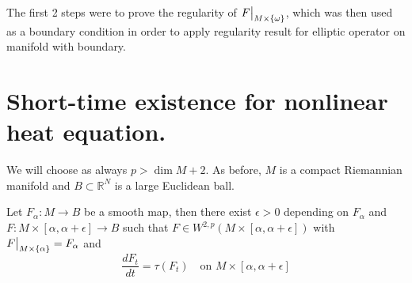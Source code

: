 \begin{remark}
The first 2 steps were to prove the regularity of \(\restr{F}{M\times
\{\omega\}}\), which was then used as a boundary condition in
order to apply regularity result for elliptic operator on manifold with boundary.
\end{remark}




\section{Short-time existence for nonlinear heat equation.}
\label{sec:org728beaf}
We will choose as always \(p > \dim M +2\). As before, \(M\) is a compact Riemannian
manifold and \(B\subset \mathbb{R}^N\) is a large Euclidean ball.

\begin{theorem}
\label{thm:short-time}
Let \(F_\alpha: M \longrightarrow  B\) be a smooth map, then there exist \(\epsilon>0\) depending on \(F_\alpha\) and \(F: M\times [\alpha,\alpha + \epsilon] \longrightarrow
B\) such that \(F\in W^{2,p}(M\times [\alpha,\alpha+\epsilon])\) with \(\restr{F}{M\times \{\alpha\}} = F_\alpha\) and
\[
 \frac{d F_t}{dt} = \tau(F_t) \quad \text{on } M\times [\alpha,\alpha +\epsilon]
\]
\end{theorem}


